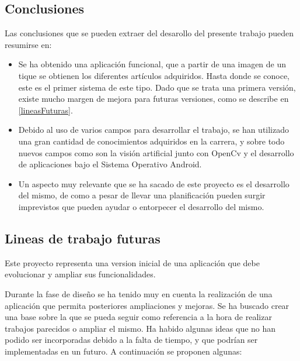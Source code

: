 \subsection{Conclusiones}
Las conclusiones que se pueden extraer del desarollo del presente trabajo pueden resumirse en:
\begin{itemize}
	\item Se ha obtenido una aplicación funcional, que a partir de una imagen de un tique se obtienen los diferentes artículos adquiridos. Hasta donde se conoce, este es el primer sistema de este tipo. Dado que se trata  una primera versión, existe mucho margen de mejora para futuras versiones, como se describe en \ref{lineasFuturas}.
	\item Debido al uso de varios campos para desarrollar el trabajo, se han utilizado una gran cantidad de conocimientos adquiridos en la carrera, y sobre todo nuevos campos como son la visión artificial junto con OpenCv y el desarrollo de aplicaciones bajo el Sistema Operativo Android.
\item Un aspecto muy relevante que se ha sacado de este proyecto es el desarrollo del mismo, de como a pesar de llevar una planificación pueden surgir imprevistos que pueden ayudar o entorpecer el desarrollo del mismo.
\end{itemize}

\subsection{Lineas de trabajo futuras \label{lineasFuturas}}
Este proyecto representa una version inicial de una aplicación que debe evolucionar y ampliar sus funcionalidades.

Durante la fase de diseño se ha tenido muy en cuenta la realización de una aplicación que permita posteriores ampliaciones y mejoras. Se ha buscado crear una base sobre la que se pueda seguir como referencia a la hora de realizar trabajos parecidos o ampliar el mismo. Ha habido algunas ideas que no han podido ser incorporadas debido a la falta de tiempo, y que podrían ser implementadas en un futuro. A continuación se proponen algunas:

